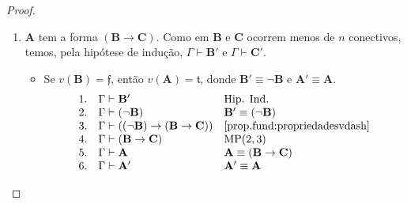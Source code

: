 \begin{proof}
\begin{enumerate}[label=\roman*.]
\begin{itemize}
\[\begin{array}{rll}
                                1. & \Gamma \vdash \mathbf{B}' & \text{Hip. Ind.} \\
                                2. & \Gamma \vdash (\neg \mathbf{B}) & \mathbf{B}' \equiv (\neg \mathbf{B}) \\
                                3. & \Gamma \vdash \mathbf{A} & \mathbf{A} \equiv (\neg \mathbf{B}) \\
                                4. & \Gamma \vdash \mathbf{A}' & \mathbf{A}' \equiv \mathbf{A}
                            \end{array}
                        \]
                    Logo $\{p'_1, \ldots, p'_n \} \vdash \mathbf{A}'$ se $\mathbf{A} \equiv (\neg \mathbf{B})$ e $v(\mathbf{B}) = \mathfrak{f}$.
                \end{itemize}
            Logo $\{p'_1, \ldots, p'_n \} \vdash \mathbf{A}'$ se $\mathbf{A} \equiv (\neg \mathbf{B})$.
            \item $\mathbf{A}$ tem a forma $(\mathbf{B} \rightarrow \mathbf{C})$. Como em $\mathbf{B}$ e $\mathbf{C}$ ocorrem menos de $n$ conectivos, temos, pela hipótese de indução, $\Gamma \vdash \mathbf{B}'$ e $\Gamma \vdash \mathbf{C}'$.
                \begin{itemize}
                    \item Se $v(\mathbf{B}) = \mathfrak{f}$, então $v(\mathbf{A}) = \mathfrak{t}$, donde $\mathbf{B}' \equiv \neg \mathbf{B}$ e $\mathbf{A}' \equiv \mathbf{A}$.
                        \[
                            \begin{array}{rll}
                                1. & \Gamma \vdash \mathbf{B}' & \text{Hip. Ind.} \\
                                2. & \Gamma \vdash (\neg \mathbf{B}) & \mathbf{B}' \equiv (\neg \mathbf{B}) \\
                                3. & \Gamma \vdash ((\neg \mathbf{B}) \rightarrow (\mathbf{B} \rightarrow \mathbf{C})) & \eqref{prop.fund:propriedadesvdash} \\
                                4. & \Gamma \vdash (\mathbf{B} \rightarrow \mathbf{C}) & \text{MP}(2,3) \\
                                5. & \Gamma \vdash \mathbf{A} & \mathbf{A} \equiv (\mathbf{B} \to \mathbf{C}) \\
                                6. & \Gamma \vdash \mathbf{A}' & \mathbf{A}' \equiv \mathbf{A}
                            \end{array}
                        \]

\end{itemize}
\end{enumerate}
\end{proof}
